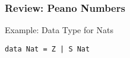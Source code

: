 \begin{frame}[fragile]
\frametitle{Review: Peano Numbers}

\begin{block}{Example: Data Type for Nats}
\begin{lstlisting}
data Nat = Z | S Nat
\end{lstlisting}
\end{block}

\end{frame}

